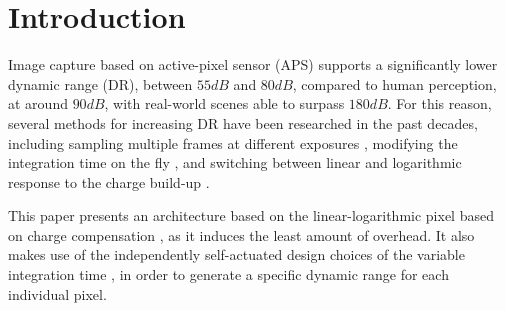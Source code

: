 \section{Introduction}

Image capture based on active-pixel sensor (APS) supports a significantly lower dynamic range (DR), between \(55dB\) and \(80dB\),
compared to human perception, at around \(90dB\), with real-world scenes able to surpass \(180dB\). For this
reason, several methods for increasing DR have been researched in the past decades, including sampling multiple 
frames at different exposures \cite{withSampling}, modifying the integration time on the fly \cite{withTime}, and
switching between linear and logarithmic response to the charge build-up \cite{withTable, withScience, withCompensation}.

This paper presents an architecture based on the linear-logarithmic pixel based on charge compensation \cite{withCompensation},
as it induces the least amount of overhead. It also makes use of the independently self-actuated design choices
of the variable integration time \cite{withTime}, in order to generate a specific dynamic range for each individual
pixel.

